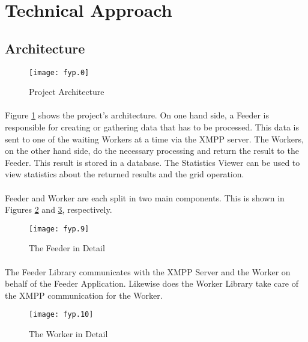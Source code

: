 \section{Technical Approach}

\subsection{Architecture}

\begin{figure}[H]
\begin{center}
\texttt{[image: fyp.0]}
\end{center}
\caption{Project Architecture}
\label{fig:architecture}
\end{figure}

\paragraph{}
Figure \ref{fig:architecture} shows the project's architecture. On one hand side, a Feeder is responsible for creating or gathering data that has to be processed. This data is sent to one of the waiting Workers at a time via the XMPP server. The Workers, on the other hand side, do the necessary processing and return the result to the Feeder. This result is stored in a database. The Statistics Viewer can be used to view statistics about the returned results and the grid operation.

\paragraph{}
Feeder and Worker are each split in two main components. This is shown in Figures \ref{fig:feeder} and \ref{fig:worker}, respectively.

\begin{figure}[H]
\begin{center}
\texttt{[image: fyp.9]}
\end{center}
\caption{The Feeder in Detail}
\label{fig:feeder}
\end{figure}

\paragraph{}
The Feeder Library communicates with the XMPP Server and the Worker on behalf of the Feeder Application. Likewise does the Worker Library take care of the XMPP communication for the Worker.

\begin{figure}[H]
\begin{center}
\texttt{[image: fyp.10]}
\end{center}
\caption{The Worker in Detail}
\label{fig:worker}
\end{figure}

